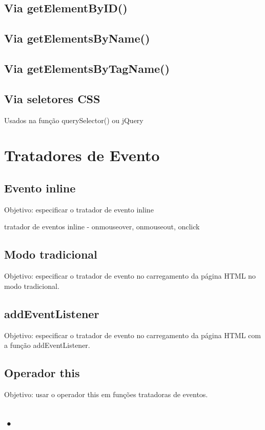 \subsection{Via getElementByID()}


\subsection{Via getElementsByName()}



\subsection{Via getElementsByTagName()}



\subsection{Via seletores CSS}
  Usados na função querySelector() ou jQuery
  
\section{Tratadores de Evento}
\subsection{Evento inline}
Objetivo: especificar o tratador de evento inline

tratador de eventos inline - onmouseover, onmouseout, onclick



\subsection{Modo tradicional}
Objetivo: especificar o tratador de evento no carregamento da página HTML no modo tradicional.
\subsection{addEventListener}
 Objetivo: especificar o tratador de evento no carregamento da página HTML com a função addEventListener.
 
\subsection{Operador this}
 Objetivo: usar o operador this em funções tratadoras de eventos.
\subsection{•}


